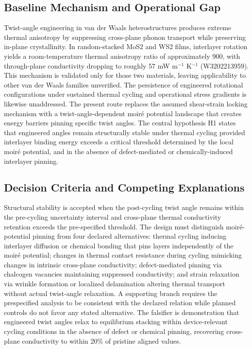 \documentclass[conference]{IEEEtran}
\begin{document}
\subsection{Baseline Mechanism and Operational Gap}
Twist-angle engineering in van der Waals heterostructures produces extreme thermal anisotropy by suppressing cross-plane phonon transport while preserving in-plane crystallinity. In random-stacked MoS2 and WS2 films, interlayer rotation yields a room-temperature thermal anisotropy ratio of approximately 900, with through-plane conductivity dropping to roughly 57 mW m$^{-1}$ K$^{-1}$ (W3202213959). This mechanism is validated only for those two materials, leaving applicability to other van der Waals families unverified. The persistence of engineered rotational configurations under sustained thermal cycling and operational stress gradients is likewise unaddressed. The present route replaces the assumed shear-strain locking mechanism with a twist-angle-dependent moiré potential landscape that creates energy barriers pinning specific twist angles. The central hypothesis H1 states that engineered angles remain structurally stable under thermal cycling provided interlayer binding energy exceeds a critical threshold determined by the local moiré potential, and in the absence of defect-mediated or chemically-induced interlayer pinning.~\cite{cite_26ecaf73d88dfe33}

\subsection{Decision Criteria and Competing Explanations}
Structural stability is accepted when the post-cycling twist angle remains within the pre-cycling uncertainty interval and cross-plane thermal conductivity retention exceeds the pre-specified threshold. The design must distinguish moiré-potential pinning from four declared alternatives: thermal cycling inducing interlayer diffusion or chemical bonding that pins layers independently of the moiré potential; changes in thermal contact resistance during cycling mimicking changes in intrinsic cross-plane conductivity; defect-mediated pinning via chalcogen vacancies maintaining suppressed conductivity; and strain relaxation via wrinkle formation or localized delamination altering thermal transport without actual twist-angle relaxation. A supporting branch requires the prespecified analysis to be consistent with the declared relation while planned controls do not favor any stated alternative. The falsifier is demonstration that engineered twist angles relax to equilibrium stacking within device-relevant cycling conditions in the absence of defect or chemical pinning, recovering cross-plane conductivity to within 20\% of pristine aligned values.~\cite{cite_26ecaf73d88dfe33,cite_6b49ace365c37cc5}
\end{document}
